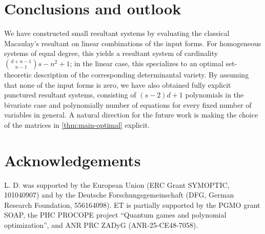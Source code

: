 \documentclass[11pt,a4paper]{article}
\numberwithin{equation}{section}
\begin{document}
\section{Conclusions and outlook}
We have constructed small resultant systems by evaluating the classical Macaulay's resultant on linear combinations of the input forms.
For homogeneous systems of equal degree, this yields a resultant system of cardinality $\binom{d+n-1}{n-1}s-n^2+1$; in the linear case, this specializes to an optimal set-theoretic description of the corresponding determinantal variety.
By assuming that none of the input forms is zero, we have also obtained fully explicit punctured resultant systems, consisting of $(s-2)d+1$ polynomials in the bivariate case and polynomially number of equations for every fixed number of variables in general.
A natural direction for the future work is making the choice of the matrices in \cref{thm:main-optimal} explicit.


\section*{Acknowledgements}
L. D. was supported by the European Union (ERC Grant SYMOPTIC, 101040907) and by the Deutsche Forschungsgemeinschaft (DFG, German Research Foundation, 556164098).
ET is  partially supported by the PGMO grant SOAP, 
the PHC PROCOPE project ``Quantum  games and polynomial optimization'',
and ANR PRC ZADyG (ANR-25-CE48-7058). 




\end{document}

